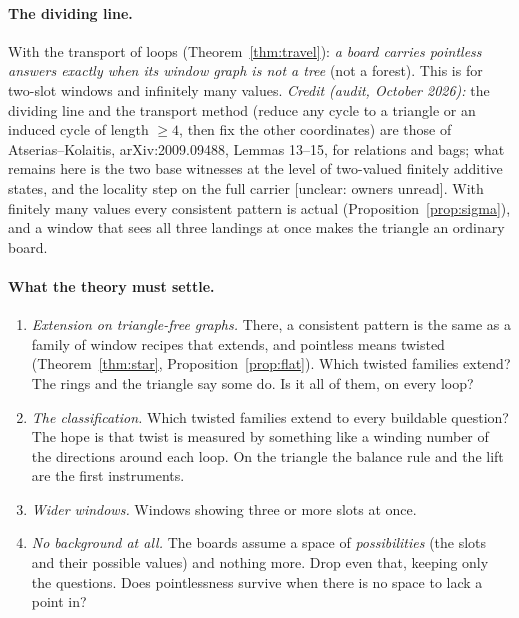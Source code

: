 \documentclass[11pt]{article}
\theoremstyle{plain}
\theoremstyle{definition}
\newcommand{\st}[1]{\textsf{\small[#1]}}
\begin{document}
\paragraph{The dividing line.} With the transport of loops
(Theorem~\ref{thm:travel}): \emph{a board carries pointless answers exactly when
its window graph is not a tree} (not a forest). This is for two-slot windows
and infinitely many values. \emph{Credit (audit, October 2026):} the dividing line
and the transport method (reduce any cycle to a triangle or an induced cycle of
length $\ge4$, then fix the other coordinates) are those of Atserias--Kolaitis,
arXiv:2009.09488, Lemmas 13--15, for relations and bags; what remains here is the
two base witnesses at the level of two-valued finitely additive states, and the
locality step on the full carrier \st{unclear: owners unread}. With finitely many values every consistent pattern
is actual (Proposition~\ref{prop:sigma}), and a window that sees all three landings at once makes the triangle
an ordinary board.

\paragraph{What the theory must settle.}
\begin{enumerate}[nosep]
  \item \emph{Extension on triangle-free graphs.} There, a consistent pattern is
    the same as a family of window recipes that extends, and pointless means
    twisted (Theorem~\ref{thm:star}, Proposition~\ref{prop:flat}). Which twisted
    families extend? The rings and the triangle say some do. Is it all of them,
    on every loop?
  \item \emph{The classification.} Which twisted families extend to every
    buildable question? The hope is that twist is measured by something like a
    winding number of the directions around each loop. On the triangle the
    balance rule and the lift are the first instruments.
  \item \emph{Wider windows.} Windows showing three or more slots at once.
  \item \emph{No background at all.} The boards assume a space of
    \emph{possibilities} (the slots and their possible values) and nothing
    more. Drop even that, keeping only the questions. Does pointlessness
    survive when there is no space to lack a point in?
\end{enumerate}

\end{document}
